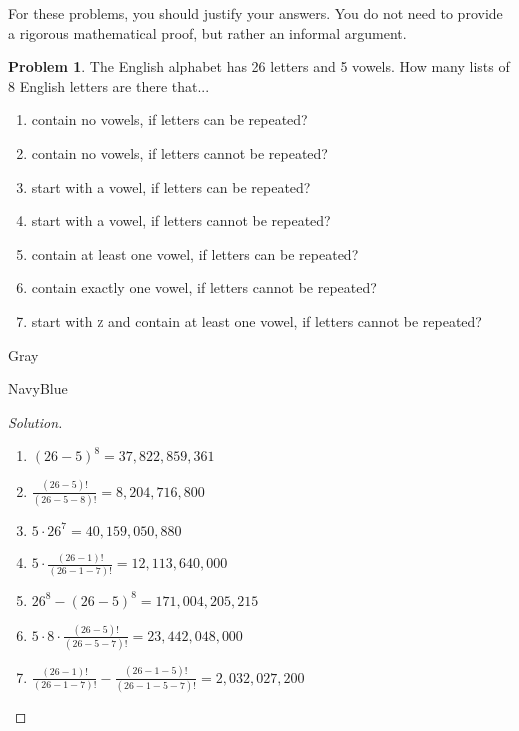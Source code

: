 \documentclass[12pt]{amsart}
\newcounter{problem_number}[section]
\theoremstyle{named}
\newenvironment{soln}
{\begin{color}{Gray}\begin{framed}\begin{color}{NavyBlue}\begin{proof}[Solution]
\doublespacing}
{\end{proof}\end{color}\end{framed}\end{color}}
\theoremstyle{definition}
\newtheorem{problem}{Problem}
\begin{document}
For these problems, you should justify your answers. You do not need to provide a rigorous mathematical proof, but rather an informal argument.

\vspace{5mm}


\begin{problem}
	The English alphabet has 26 letters and 5 vowels. How many lists of 8 English letters are there that...
	\begin{enumerate}
		\item contain no vowels, if letters can be repeated?
		\item contain no vowels, if letters cannot be repeated?
		\item start with a vowel, if letters can be repeated?
		\item start with a vowel, if letters cannot be repeated?
		\item contain at least one vowel, if letters can be repeated?
		\item contain exactly one vowel, if letters cannot be repeated?
		\item start with \textsc{z} and contain at least one vowel, if letters cannot be repeated?
	\end{enumerate}
\end{problem}

\begin{soln}
	\phantom{ }
    \begin{enumerate}
        \item $(26-5)^8 = 37,822,859,361$
        
		\phantom{ }

        \item $\displaystyle\frac{(26-5)!}{(26-5-8)!} = 8,204,716,800$
		
		\phantom{ }

		\item $5 \cdot 26^7 = 40,159,050,880$
				
		\phantom{ }

        \item $\displaystyle5 \cdot \frac{(26-1)!}{(26-1-7)!} = 12,113,640,000$
        		
		\phantom{ }

		\item $26^8 - (26-5)^8 = 171,004,205,215$
        		
		\phantom{ }

		\item $\displaystyle5 \cdot 8 \cdot \frac{(26-5)!}{(26-5-7)!} = 23,442,048,000$
        		
		\phantom{ }

		\item $\displaystyle\frac{(26-1)!}{(26-1-7)!} - \frac{(26-1-5)!}{(26-1-5-7)!} = 2,032,027,200$
    \end{enumerate}
\end{soln}
		
\end{document}
